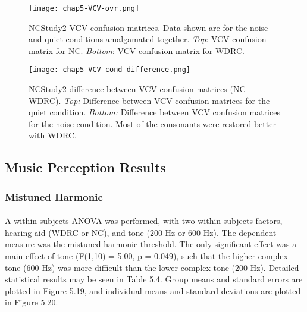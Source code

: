 \begin{figure}[htp]
\begin{center}
\texttt{[image: chap5-VCV-ovr.png]} \\
\caption[NCStudy2 VCV overall confusion matrices]{NCStudy2 VCV confusion matrices.  Data shown are for the noise and quiet conditions amalgamated together.  \emph{Top}: VCV confusion matrix for NC.  \emph{Bottom}: VCV confusion matrix for WDRC.}
\label{ch5-VCV-ovr}
\end{center}
\end{figure}

\clearpage

\begin{figure}[htp]
\begin{center}
\texttt{[image: chap5-VCV-cond-difference.png]} \\
\caption[NCStudy2 difference between VCV confusion matrices (NC - WDRC) ]{NCStudy2 difference between VCV confusion matrices (NC - WDRC).  \emph{Top:} Difference between VCV confusion matrices for the quiet condition.  \emph{Bottom:} Difference between VCV confusion matrices for the noise condition.  Most of the consonants were restored better with WDRC.}
\label{ch5-VCV-cond-difference}
\end{center}
\end{figure}

\subsection{Music Perception Results}
\subsubsection{Mistuned Harmonic}
\paragraph{}A within-subjects ANOVA was performed, with two within-subjects factors, hearing aid (WDRC or NC), and tone (200 Hz or 600 Hz).  The dependent measure was the mistuned harmonic threshold.  The only significant effect was a main effect of tone (F(1,10) = 5.00, p = 0.049), such that the higher complex tone (600 Hz) was more difficult than the lower complex tone (200 Hz).  Detailed statistical results may be seen in Table 5.4.  Group means and standard errors are plotted in Figure 5.19, and individual means and standard deviations are plotted in Figure 5.20.

